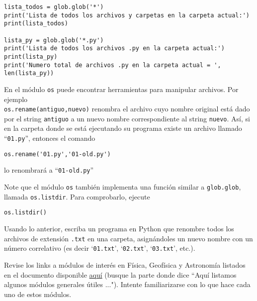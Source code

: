 \documentclass[11pt]{exam}
\begin{document}
\begin{questions}
\begin{verbatim}
lista_todos = glob.glob('*')
print('Lista de todos los archivos y carpetas en la carpeta actual:')
print(lista_todos)

lista_py = glob.glob('*.py')
print('Lista de todos los archivos .py en la carpeta actual:')
print(lista_py)
print('Numero total de archivos .py en la carpeta actual = ', len(lista_py))
\end{verbatim}

\item En el módulo \texttt{os} puede encontrar herramientas para manipular archivos. Por ejemplo \\ \texttt{os.rename(antiguo,nuevo)} renombra el archivo cuyo nombre original está dado por el string \texttt{antiguo} a un nuevo nombre correspondiente al string \texttt{nuevo}. Así, si en la carpeta donde se está ejecutando su programa existe un archivo llamado ``\texttt{01.py}'', entonces el comando 
\begin{verbatim}
os.rename('01.py','01-old.py')
\end{verbatim}

lo renombrará a ``\texttt{01-old.py}''

\item Note que el módulo \texttt{os} también implementa una función similar a \texttt{glob.glob}, llamada \texttt{os.listdir}. Para comprobarlo, ejecute
\begin{verbatim}
os.listdir()
\end{verbatim}

\item Usando lo anterior, escriba un programa en Python que renombre todos los archivos de extensión \texttt{.txt} en una carpeta, asignándoles un nuevo nombre con un número correlativo (es decir `\texttt{01.txt}', `\texttt{02.txt}', `\texttt{03.txt}', etc.).


\item Revise los links a módulos de interés en Física, Geofísica y Astronomía listados en el documento disponible \href{https://github.com/gfrubi/CC/blob/master/Python/01-Introduccion-a-la-Programacion-en-Python.ipynb}{aquí} (busque la parte donde dice ``Aquí listamos algunos módulos generales útiles ..."). Intente familiarizarse con lo que hace cada uno de estos módulos.
\end{questions}
\end{document}
